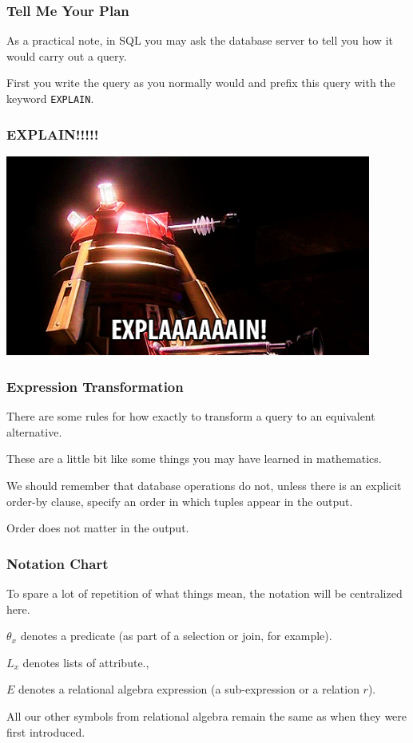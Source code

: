 \begin{frame}
\frametitle{Tell Me Your Plan}

As a practical note, in SQL you may ask the database server to tell you how it would carry out a query. 

First you write the query as you normally would and prefix this query with the keyword \texttt{EXPLAIN}.


\end{frame}
\begin{frame}
\frametitle{EXPLAIN!!!!!}

\begin{center}
\includegraphics[width=0.9\textwidth]{images/EXPLAIN.png}
\end{center}


\end{frame}

\begin{frame}
\frametitle{Expression Transformation}

There are some rules for how exactly to transform a query to an equivalent alternative. 

These are a little bit like some things you may have learned in mathematics. 

We should remember that database operations do not, unless there is an explicit order-by clause, specify an order in which tuples appear in the output. 

Order does not matter in the output. 

\end{frame}

\begin{frame}
\frametitle{Notation Chart}

To spare a lot of repetition of what things mean, the notation will be centralized here. 

$\theta_{x}$ denotes a predicate (as part of a selection or join, for example).

$L_{x}$ denotes lists of attribute., 

$E$ denotes a relational algebra expression (a sub-expression or a relation $r$).

 All our other symbols from relational algebra remain the same as when they were first introduced.


\end{frame}

